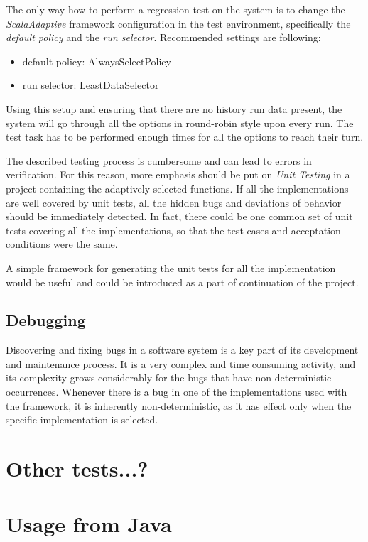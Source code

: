 The only way how to perform a regression test on the system is to change the \textit{ScalaAdaptive} framework configuration in the test environment, specifically the \textit{default policy} and the \textit{run selector}. Recommended settings are following:

 \begin{itemize}
 	\item default policy: AlwaysSelectPolicy
 	\item run selector: LeastDataSelector
 \end{itemize}

Using this setup and ensuring that there are no history run data present, the system will go through all the options in round-robin style upon every run. The test task has to be performed enough times for all the options to reach their turn.

The described testing process is cumbersome and can lead to errors in verification. For this reason, more emphasis should be put on \textit{Unit Testing} in a project containing the adaptively selected functions. If all the implementations are well covered by unit tests, all the hidden bugs and deviations of behavior should be immediately detected. In fact, there could be one common set of unit tests covering all the implementations, so that the test cases and acceptation conditions were the same.

A simple framework for generating the unit tests for all the implementation would be useful and could be introduced as a part of continuation of the project.

\subsection{Debugging}

Discovering and fixing bugs in a software system is a key part of its development and maintenance process. It is a very complex and time consuming activity, and its complexity grows considerably for the bugs that have non-deterministic occurrences. Whenever there is a bug in one of the implementations used with the framework, it is inherently non-deterministic, as it has effect only when the specific implementation is selected.

\section{Other tests...?}

\section{Usage from Java}

